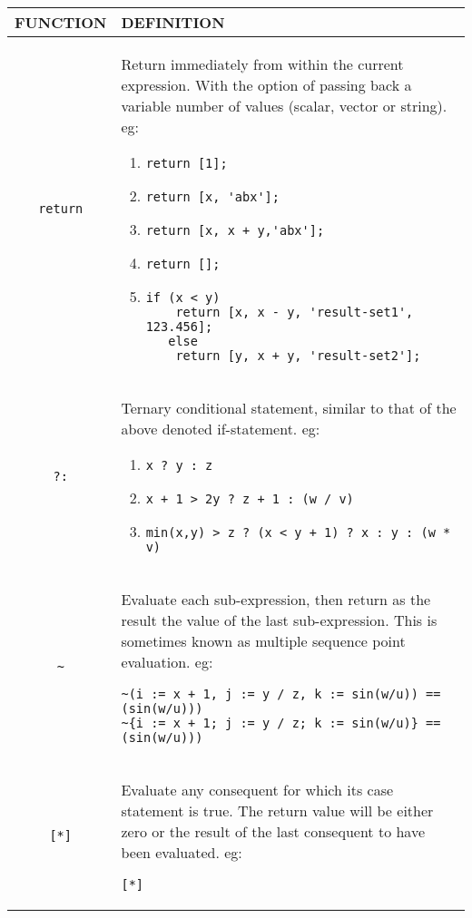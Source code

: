 \begin{tabular}{|c|p{}|}
\hline
FUNCTION& DEFINITION\\
\hline
\verb'return'& Return immediately from within the current expression.
With the option of passing back a variable number of
values (scalar, vector or string). eg:
\begin{enumerate}
\item\verb"return [1]; "                                     
\item\verb"return [x, 'abx'];"                              
\item\verb"return [x, x + y,'abx'];"                         
\item\verb"return [];"                                       
\item
\begin{verbatim}
if (x < y)                                       
    return [x, x - y, 'result-set1', 123.456];      
   else                                             
    return [y, x + y, 'result-set2'];               
\end{verbatim}
\end{enumerate}
\\
\verb'?:'& Ternary conditional statement, similar to that of the
above denoted if-statement.                     
eg:
\begin{enumerate}
\item\verb"x ? y : z"                                    
\item\verb"x + 1 > 2y ? z + 1 : (w / v)"                 
\item\verb"min(x,y) > z ? (x < y + 1) ? x : y : (w * v)"
\end{enumerate}
\\
\verb'~'& Evaluate each sub-expression, then return as the result 
the value of the last sub-expression. This is sometimes
known as multiple sequence point evaluation.           
eg:                                                    
\begin{verbatim}
~(i := x + 1, j := y / z, k := sin(w/u)) == (sin(w/u)))
~{i := x + 1; j := y / z; k := sin(w/u)} == (sin(w/u)))
\end{verbatim}
\\
\verb'[*]'& Evaluate any consequent for which its case statement is 
true. The return value will be either zero or the result
of the last consequent to have been evaluated.          
eg:
\begin{verbatim}
[*]                                                     

\end{verbatim}
\end{tabular}
